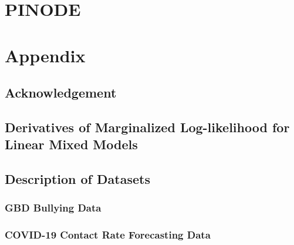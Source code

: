 \documentclass[12pt,a4paper]{book}
\numberwithin{equation}{section} %
\numberwithin{figure}{section} %
\numberwithin{table}{section} %
\begin{document}
\chapter{PINODE}







\clearpage

\appendix
\chapter{Appendix}
\section{Acknowledgement}


\section{Derivatives of Marginalized Log-likelihood for Linear Mixed Models}
\label{appendix:derivatives_of_lmm}


\section{Description of Datasets}
\subsection{GBD Bullying Data}


\subsection{COVID-19 Contact Rate Forecasting Data}


\end{document}
